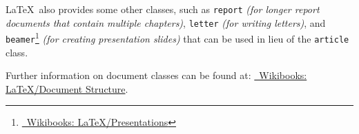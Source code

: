 \LaTeX\ also provides some other classes, such as \texttt{report} \textit{(for longer report documents that contain multiple chapters)}, \texttt{letter} \textit{(for writing letters)}, and \texttt{beamer}\footnote{\href{https://en.wikibooks.org/wiki/LaTeX/Presentations}{\faBook\ Wikibooks: \LaTeX{}/Presentations}} \textit{(for creating presentation slides)} that can be used in lieu of the \texttt{article} class.

Further information on document classes can be found at: \href{https://en.wikibooks.org/wiki/LaTeX/Document_Structure#Document_classes}{\faBook\ Wikibooks: \LaTeX{}/Document Structure}.
